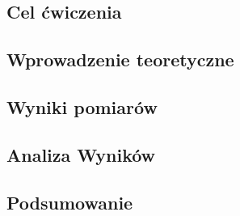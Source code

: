 \documentclass[10.5pt]{article}
\begin{document}
\vspace{2cm}

\subsection*{Cel ćwiczenia}
\subsection*{Wprowadzenie teoretyczne}
\subsection*{Wyniki pomiarów}
\subsection*{Analiza Wyników}
\subsection*{Podsumowanie}
\end{document}

